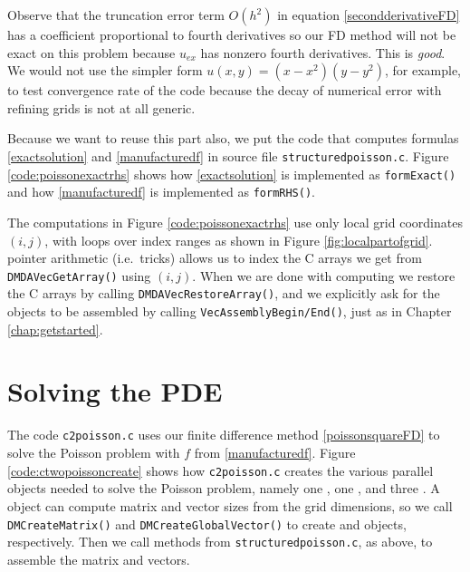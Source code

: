Observe that the truncation error term $O(h^2)$ in equation \eqref{secondderivativeFD} has a coefficient proportional to fourth derivatives \citep{MortonMayers} so our FD method will not be exact on this problem because $u_{ex}$ has nonzero fourth derivatives.  This is \emph{good}.  We would not use the simpler form $u(x,y)=(x-x^2)(y-y^2)$, for example, to test convergence rate of the code because the decay of numerical error with refining grids is not at all generic.

Because we want to reuse this part also, we put the code that computes formulas \eqref{exactsolution} and \eqref{manufacturedf} in source file \texttt{structuredpoisson.c}.  Figure \ref{code:poissonexactrhs} shows how \eqref{exactsolution} is implemented as \texttt{formExact()} and how \eqref{manufacturedf} is implemented as \texttt{formRHS()}.

\vfill
\newpage
{}

The computations in Figure \ref{code:poissonexactrhs} use only local grid coordinates $(i,j)$, with loops over index ranges as shown in Figure \ref{fig:localpartofgrid}.  \PETSc pointer arithmetic (i.e.~tricks) allows us to index the C arrays we get from \texttt{DMDAVecGetArray()} using $(i,j)$.  When we are done with computing \pVecs we restore the C arrays by calling \texttt{DMDAVecRestoreArray()}, and we explicitly ask for the \pVec objects to be assembled by calling \texttt{VecAssemblyBegin/End()}, just as in Chapter \ref{chap:getstarted}.


\vfill
\newpage
\section{Solving the PDE}

The code \texttt{c2poisson.c} uses our finite difference method \eqref{poissonsquareFD} to solve the Poisson problem with $f$ from \eqref{manufacturedf}.  Figure \ref{code:ctwopoissoncreate} shows how \texttt{c2poisson.c} creates the various parallel objects needed to solve the Poisson problem, namely one \pDM, one \pMat, and three \pVecs.  A \pDM object can compute matrix and vector sizes from the grid dimensions, so we call \texttt{DMCreateMatrix()} and \texttt{DMCreateGlobalVector()} to create \pMat and \pVec objects, respectively.  Then we call methods from \texttt{structuredpoisson.c}, as above, to assemble the matrix and vectors.

